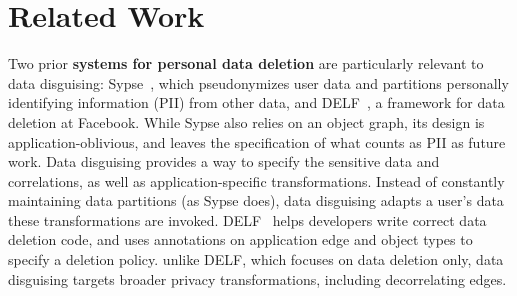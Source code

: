 \section{Related Work}
\label{sec:related}

%
Two prior \textbf{systems for personal data deletion} are particularly relevant to data
disguising: Sypse~\cite{sypse}, which pseudonymizes user
data and partitions personally identifying information (PII) from other data, and
DELF~\cite{delf}, a framework for data deletion at Facebook.
%
While Sypse also relies on an object graph, its design is application-oblivious, and leaves the
specification of what counts as PII as future work.
%
Data disguising provides a way to specify the sensitive data and correlations, as well as
application-specific transformations.
%
Instead of constantly maintaining data partitions (as Sypse does), data disguising adapts a user's
data these transformations are invoked.
%
%
%
DELF~\cite{delf} helps developers write correct data deletion code, and uses annotations on
application edge and object types to specify a deletion policy.
%
unlike DELF, which focuses on data deletion
only, data disguising targets broader privacy transformations, including decorrelating edges.
%

